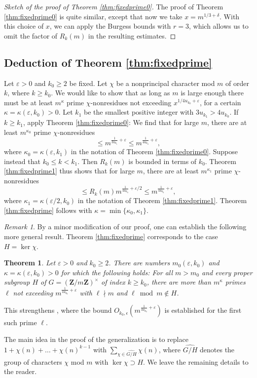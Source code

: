 \documentclass{scrartcl}
\theoremstyle{plain}
\newtheorem{thm}{Theorem}[section]
\theoremstyle{remark}
\newtheorem*{remark}{Remark}
\newcommand{\1}{\mathbf{1}}
\newcommand{\Z}{\mathbf{Z}}
\begin{document}
\begin{proof}[Sketch of the proof of Theorem \ref{thm:fixedprime0}] The proof of Theorem \ref{thm:fixedprime0} is quite similar, except that now we take $x = m^{1/3+\delta}$. With this choice of $x$, we can apply the Burgess bounds with $r=3$, which allows us to omit the factor of $R_k(m)$ in the resulting estimates.\end{proof}

\subsection{Deduction of Theorem \ref{thm:fixedprime}} Let $\varepsilon> 0$ and $k_0 \ge 2$ be fixed. Let $\chi$ be a nonprincipal character mod $m$ of order $k$, where $k \ge k_0$. We would like to show that as long as $m$ is large enough there must be at least $m^{\kappa}$ prime $\chi$-nonresidues not exceeding $x^{1/4u_{k_0}+\varepsilon}$, for a certain $\kappa = \kappa(\varepsilon,k_0) > 0$. Let $k_1$ be the smallest positive integer with $3u_{k_1} > 4u_{k_0}$.  If $k \ge k_1$, apply Theorem \ref{thm:fixedprime0}: We find that for large $m$, there are at least $m^{\kappa_0}$ prime $\chi$-nonresidues
\[ \le m^{\frac{1}{3u_{k_1}} + \varepsilon} \le m^{\frac{1}{4u_{k_0}} + \varepsilon}, \]
where $\kappa_0 = \kappa(\varepsilon,k_1)$ in the notation of Theorem \ref{thm:fixedprime0}. Suppose instead that $k_0 \le k< k_1$. Then $R_k(m)$ is bounded in terms of $k_0$. Theorem \ref{thm:fixedprime1} thus shows that for large $m$, there are at least $m^{\kappa_1}$ prime $\chi$-nonresidues
\[ \le R_k(m) m^{\frac{1}{4u_{k_0}} + \varepsilon/2} \le m^{\frac{1}{4u_{k_0}}+\varepsilon}, \]
where $\kappa_1 = \kappa(\varepsilon/2,k_0)$ in the notation of Theorem \ref{thm:fixedprime1}. Theorem \ref{thm:fixedprime} follows with $\kappa = \min\{\kappa_0,\kappa_1\}$.

\begin{remark} By a minor modification of our proof, one can establish the following more general result. Theorem \ref{thm:fixedprime} corresponds to the case $H = \ker\chi$.

\begin{thm} Let $\varepsilon >0$ and $k_0 \ge 2$. There are numbers $m_0(\varepsilon,k_0)$ and $\kappa = \kappa(\varepsilon,k_0) > 0$ for which the following holds: For all $m > m_0$ and every proper subgroup $H$ of $G=(\Z/m\Z)^{\times}$ of index $k \ge k_0$, there are more than $m^{\kappa}$ primes $\ell$ not exceeding $m^{\frac{1}{4u_{k_0}}+\varepsilon}$ with $\ell \nmid m$ and $\ell \bmod{m}\notin H$.\end{thm}

\noindent This strengthens \cite[Theorem 1.20]{norton98}, where the bound $O_{k_0,\epsilon}(m^{\frac{1}{4u_{k_0}}+\varepsilon})$ is established for the first such prime $\ell$.

The main idea in the proof of the generalization is to replace $1+\chi(n)+\dots + \chi(n)^{k-1}$ with $\sum_{\chi\in \widehat{G/H}} \chi(n)$, where $\widehat{G/H}$ denotes the group of characters $\chi$ mod $m$ with $\ker \chi \supset H$. We leave the remaining details to the reader.
\end{remark}
\end{document}
